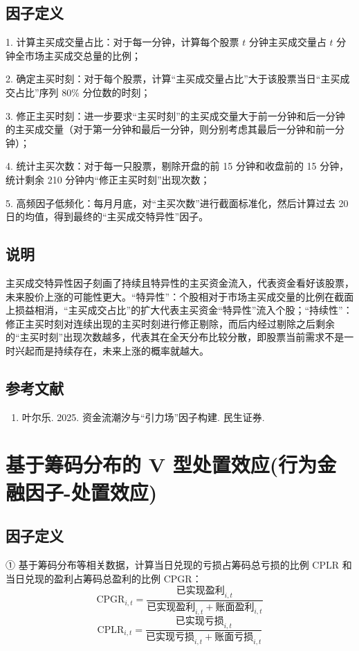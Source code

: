 \documentclass{article}
\begin{document}
\subsection{因子定义}

1. 计算主买成交量占比：对于每一分钟，计算每个股票 \( t \) 分钟主买成交量占 \( t \) 分钟全市场主买成交总量的比例；

2. 确定主买时刻：对于每个股票，计算“主买成交量占比”大于该股票当日“主买成交占比”序列 80\% 分位数的时刻；

3. 修正主买时刻：进一步要求“主买时刻”的主买成交量大于前一分钟和后一分钟的主买成交量（对于第一分钟和最后一分钟，则分别考虑其最后一分钟和前一分钟）；

4. 统计主买次数：对于每一只股票，剔除开盘的前 15 分钟和收盘前的 15 分钟，统计剩余 210 分钟内“修正主买时刻”出现次数；

5. 高频因子低频化：每月月底，对“主买次数”进行截面标准化，然后计算过去 20 日的均值，得到最终的“主买成交特异性”因子。

\subsection{说明}
主买成交特异性因子刻画了持续且特异性的主买资金流入，代表资金看好该股票，未来股价上涨的可能性更大。“特异性”：个股相对于市场主买成交量的比例在截面上损益相消，“主买成交占比”的扩大代表主买资金“特异性”流入个股；“持续性”：修正主买时刻对连续出现的主买时刻进行修正剔除，而后内经过剔除之后剩余的“主买时刻”出现次数越多，代表其在全天分布比较分散，即股票当前需求不是一时兴起而是持续存在，未来上涨的概率就越大。

\subsection{参考文献}
\begin{enumerate}
    \item 叶尔乐. 2025. 资金流潮汐与“引力场”因子构建. 民生证券.
\end{enumerate}

\section{基于筹码分布的 V 型处置效应(行为金融因子-处置效应)}

\subsection{因子定义}

① 基于筹码分布等相关数据，计算当日兑现的亏损占筹码总亏损的比例 \( \mathrm{CPLR} \) 和当日兑现的盈利占筹码总盈利的比例 \( \mathrm{CPGR} \)：
\begin{equation}
    \mathrm{CPGR}_{i,t} = \frac{\text{已实现盈利}_{i,t}}{\text{已实现盈利}_{i,t} + \text{账面盈利}_{i,t}}
\end{equation}
\begin{equation}
    \mathrm{CPLR}_{i,t} = \frac{\text{已实现亏损}_{i,t}}{\text{已实现亏损}_{i,t} + \text{账面亏损}_{i,t}}
\end{equation}
\end{document}
